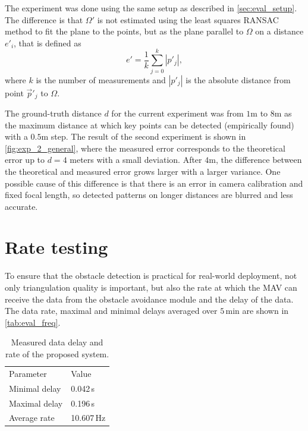 The experiment was done using the same setup as described in \autoref{sec:eval_setup}. 
The difference is that $\Omega'$ is not estimated using the least squares RANSAC method to fit the plane to the points, but as the plane parallel to $\Omega$ on a distance $e'_i$, that is defined as
\begin{equation}    
    e' = \frac{1}{k} \sum_{j=0}^{k}{|p'_j|},
\end{equation}
where $k$ is the number of measurements and $|p'_j|$ is the absolute distance from point $\vec{p}'_j$ to $\Omega$.


The ground-truth distance $d$ for the current experiment was from $1$m to $8$m as the maximum distance at which key points can be detected (empirically found) with a $0.5$m step.
The result of the second experiment is shown in \autoref{fig:exp_2_general}, where the measured error corresponds to the theoretical error up to $d=4$ meters with a small deviation. 
After $4$m, the difference between the theoretical and measured error grows larger with a larger variance.
One possible cause of this difference is that there is an error in camera calibration and fixed focal length, so detected patterns on longer distances are blurred and less accurate. 

\section{Rate testing}
To ensure that the obstacle detection is practical for real-world deployment, not only triangulation quality is important, but also the rate at which the MAV can receive the data from the obstacle avoidance module and the delay of the data.
The data rate, maximal and minimal delays averaged over $5\,$min are shown in \autoref{tab:eval_freq}.
\begin{table}[ht]
    \begin{center}
      \begin{tabular}{ll}
      \hline
        Parameter & Value \\
        Minimal delay &  0.042\,s \\
        Maximal delay &  0.196\,s \\
        Average rate & 10.607\,Hz \\ 
      \end{tabular}
    \end{center}
    \caption{Measured data delay and rate of the proposed system.}
    \label{tab:eval_freq}
\end{table}
 
